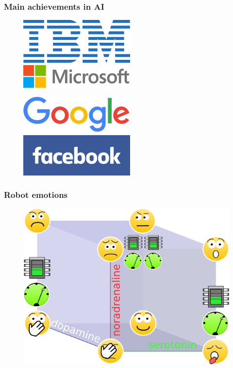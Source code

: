 \documentclass[12pt, aspectratio=169]{beamer}
\begin{document}
\begin{frame}
\frametitle{Main achievements in AI}
\begin{figure}
  \includegraphics[width=0.45\linewidth]{220px-IBM.png}
  \includegraphics[width=0.45\linewidth]{220px-Microsoft.png}
\end{figure}
\begin{figure}
  \includegraphics[width=0.45\linewidth]{220px-Google.png}
  \includegraphics[width=0.45\linewidth]{220px-Facebook.png}
\end{figure}
\end{frame}

\begin{frame}
\frametitle{Robot emotions}
\begin{figure}
\includegraphics[width=0.7\linewidth]{cube_of_emotional_parameters_machine}
\end{figure}
\end{frame}
\end{document}
